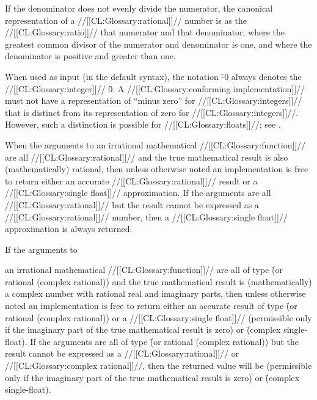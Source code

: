If the denominator does not evenly divide the numerator, the canonical representation of a //[[CL:Glossary:rational]]// number is as the //[[CL:Glossary:ratio]]// that numerator and that denominator, where the greatest common divisor of the numerator and denominator is one, and where the denominator is positive and greater than one.

When used as input (in the default syntax), the notation \f{-0} always denotes the //[[CL:Glossary:integer]]// \f{0}. A //[[CL:Glossary:conforming implementation]]// must not have a representation of ``minus zero'' for //[[CL:Glossary:integers]]// that is distinct from its representation of zero for //[[CL:Glossary:integers]]//. However, such a distinction is possible for //[[CL:Glossary:floats]]//;  see .

\endsubsubsection%

 

When the arguments to an irrational mathematical //[[CL:Glossary:function]]//   are all //[[CL:Glossary:rational]]// and the true mathematical result is also (mathematically) rational, then unless otherwise noted an implementation is free to return either an accurate //[[CL:Glossary:rational]]// result or a //[[CL:Glossary:single float]]// approximation. If the arguments are all //[[CL:Glossary:rational]]//  but the result cannot be expressed as a //[[CL:Glossary:rational]]// number, then a //[[CL:Glossary:single float]]//  approximation is always returned.

 If the arguments to 

an irrational mathematical //[[CL:Glossary:function]]// are all of type
  \f{(or rational (complex rational))}  and the true mathematical result is
  (mathematically) a complex number with rational real and imaginary
  parts, then unless otherwise noted an implementation is free to return
  either an accurate result of type \f{(or rational (complex rational))}  or
  a //[[CL:Glossary:single float]]//
  (permissible only if the imaginary part of the true mathematical
  result is zero) or \f{(complex single-float)}. If the arguments are
  all of type \f{(or rational (complex rational))} but the result cannot be
  expressed as a //[[CL:Glossary:rational]]// or //[[CL:Glossary:complex rational]]//, then the returned
  value will be   (permissible only if the imaginary
  part of the true mathematical result is zero) or \f{(complex single-float)}.


